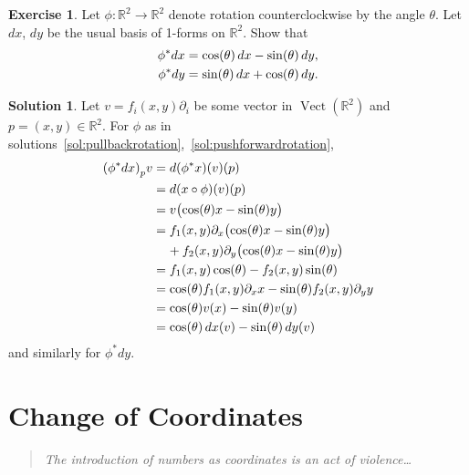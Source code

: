 \documentclass[11pt, a4paper]{report}
\theoremstyle{definition}
\newtheorem{exercise}{Exercise}[part]
\newtheorem{solution}{Solution}[part]
\newenvironment{ex}{\begin{exercise}}{\end{exercise}\pagebreak[1]}
\newenvironment{sol}{\begin{solution}}{\end{solution}\pagebreak[3]}
\newenvironment{epigraph}
    {\begin{quote}\small\itshape} %
    {\end{quote}\ignorespacesafterend\vspace{\parskip}}
\newcommand*{\pheq}{\ensuremath\mathrel{\phantom{=}}\negmedspace{}}
\renewcommand*{\d}{\ensuremath\mathop{}\mathopen{}d}
\DeclareMathOperator{\Vect}{Vect}
\begin{document}
\begin{ex}

Let $\phi: \mathbb{R}^2 \to \mathbb{R}^2$ denote rotation counterclockwise by the angle $\theta$. Let $dx$, $dy$ be the usual basis of 1-forms on $\mathbb{R}^2$. Show that
\begin{align*}
    \phi^* dx &= \cos(\theta) \d x - \sin(\theta) \d y, \\
    \phi^* dy &= \sin(\theta) \d x + \cos(\theta) \d y.
\end{align*}

\end{ex}

\begin{sol}

Let $v = f_i(x, y)\partial_i$ be some vector in $\Vect(\mathbb{R}^2)$ and $p = (x, y) \in \mathbb{R}^2$. For $\phi$ as in solutions~\ref{sol:pullbackrotation},~\ref{sol:pushforwardrotation},
\begin{align*}
    {(\phi^* dx)}_p v &= d(\phi^* x)(v)(p) \\
        &= d(x \circ \phi)(v)(p) \\
        &= v \bigl( \cos(\theta) x - \sin(\theta) y \bigr) \\
        &= f_1(x, y) \partial_x \bigl( \cos(\theta) x - \sin(\theta) y \bigr) \\
        &\pheq + f_2(x, y) \partial_y \bigl( \cos(\theta) x
               - \sin(\theta) y \bigr) \\
        &= f_1(x, y) \cos(\theta) - f_2(x, y) \sin(\theta) \\
        &= \cos(\theta) f_1(x, y) \partial_x x
           - \sin(\theta) f_2(x, y) \partial_y y \\
        &= \cos(\theta) v(x) - \sin(\theta) v(y) \\
        &= \cos(\theta) \d x(v) - \sin(\theta) \d y(v)
\end{align*}
and similarly for $\phi^* dy$.

\end{sol}

\section{Change of Coordinates}

\begin{epigraph}
    The introduction of numbers as coordinates \textup{\textelp{}} is an act of violence\ldots
\end{epigraph}
\end{document}
